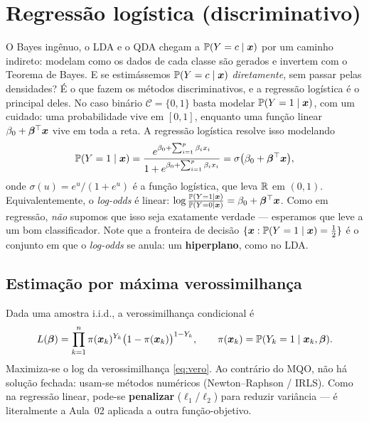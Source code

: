 \documentclass[11pt,a4paper]{article}
\begin{document}
\section{Regressão logística (discriminativo)}
O Bayes ingênuo, o LDA e o QDA chegam a $\mathbb{P}(Y=c\mid\bm{x})$ por um caminho indireto:
modelam como os dados de cada classe são gerados e invertem com o Teorema de Bayes.
E se estimássemos $\mathbb{P}(Y=c\mid\bm{x})$ \emph{diretamente}, sem passar pelas densidades?
É o que fazem os métodos discriminativos, e a regressão logística é o principal
deles. No caso binário $\mathcal{C}=\{0,1\}$ basta modelar $\mathbb{P}(Y=1\mid\bm{x})$, com um
cuidado: uma probabilidade vive em $[0,1]$, enquanto uma função linear
$\beta_0+\bm{\beta}^\top\bm{x}$ vive em toda a reta. A regressão logística resolve isso
modelando
\begin{equation}\label{eq:logit}
  \mathbb{P}(Y=1\mid\bm{x}) = \frac{e^{\beta_0+\sum_{i=1}^p\beta_i x_i}}
                          {1+e^{\beta_0+\sum_{i=1}^p\beta_i x_i}}
  = \sigma\big(\beta_0+\bm{\beta}^\top\bm{x}\big),
\end{equation}
onde $\sigma(u)=e^u/(1+e^u)$ é a função logística, que leva $\mathbb{R}$ em $(0,1)$.
Equivalentemente, o \emph{log-odds} é linear:
$\log\frac{\mathbb{P}(Y=1\mid\bm{x})}{\mathbb{P}(Y=0\mid\bm{x})} =\beta_0+\bm{\beta}^\top\bm{x}$. Como em
regressão, \emph{não} supomos que isso seja exatamente verdade --- esperamos que
leve a um bom classificador. Note que a fronteira de decisão
$\{\bm{x} : \mathbb{P}(Y=1\mid\bm{x})=\tfrac12\}$ é o conjunto em que o \emph{log-odds} se anula:
um \textbf{hiperplano}, como no LDA.


\subsection{Estimação por máxima verossimilhança}
Dada uma amostra i.i.d., a verossimilhança condicional é
\begin{equation}\label{eq:vero}
  L(\bm{\beta}) = \prod_{k=1}^n \pi(\bm{x}_k)^{Y_k}\big(1-\pi(\bm{x}_k)\big)^{1-Y_k},
  \qquad \pi(\bm{x}_k)=\mathbb{P}(Y_k=1\mid\bm{x}_k,\bm{\beta}).
\end{equation}
Maximiza-se o log da verossimilhança \eqref{eq:vero}. Ao contrário do MQO, não há
solução fechada: usam-se métodos numéricos (Newton--Raphson / IRLS). Como na
regressão linear, pode-se \textbf{penalizar} ($\ell_1$/$\ell_2$) para reduzir
variância --- é literalmente a Aula~02 aplicada a outra função-objetivo.
\end{document}
